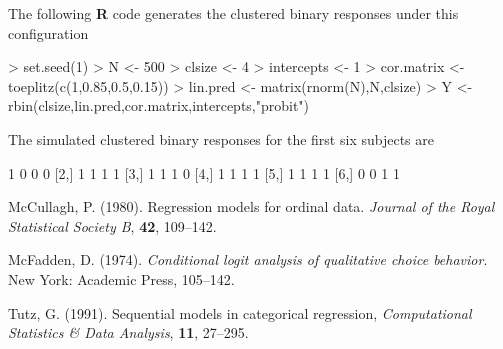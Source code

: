 \documentclass{article}
\begin{document}
The following \textbf{R} code generates the clustered binary responses under this configuration
\begin{Schunk}
\begin{Sinput}
> set.seed(1)
> N <- 500
> clsize <- 4
> intercepts <- 1
> cor.matrix <- toeplitz(c(1,0.85,0.5,0.15))
> lin.pred <- matrix(rnorm(N),N,clsize)
> Y <- rbin(clsize,lin.pred,cor.matrix,intercepts,"probit")   
\end{Sinput}
\end{Schunk}
The simulated clustered binary responses for the first six subjects are 
\begin{Schunk}
\begin{Soutput}
     [,1] [,2] [,3] [,4]
[1,]    1    0    0    0
[2,]    1    1    1    1
[3,]    1    1    1    0
[4,]    1    1    1    1
[5,]    1    1    1    1
[6,]    0    0    1    1
\end{Soutput}
\end{Schunk}
  \begin{thebibliography}{1}
\bibitem{}  McCullagh, P. (1980). Regression models for ordinal data. \textit{Journal of the Royal Statistical Society B}, \textbf{42}, 109--142.

\bibitem{}  McFadden, D. (1974). \textit{Conditional logit analysis of qualitative choice behavior}. New York: Academic Press, 105--142.

\bibitem{}  Tutz, G. (1991). Sequential models in categorical regression, \textit{Computational Statistics \& Data Analysis}, \textbf{11}, 27--295.
  \end{thebibliography}
\end{document}
